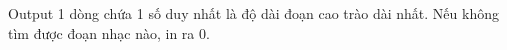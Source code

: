 Output
1 dòng chứa 1 số duy nhất là độ dài đoạn cao trào dài nhất. Nếu không tìm được đoạn nhạc nào, in ra 0.